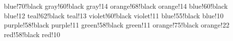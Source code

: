 %

   {blue!70!black}
  {gray!60!black}
     {gray!14}
    {orange!68!black}
       {orange!14}
    {blue!60!black}
       {blue!12}
    {teal!62!black}
       {teal!13}
  {violet!60!black}
     {violet!11}
  {blue!55!black}
     {blue!10}
   {purple!58!black}
      {purple!11}
    {green!58!black}
       {green!11}
    {orange!75!black}
       {orange!22}
   {red!58!black}
      {red!10}

